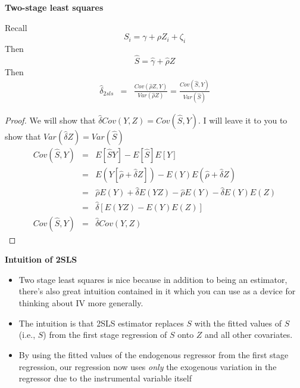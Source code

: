 \documentclass[notes=show]{beamer}
\begin{document}
\begin{frame}[plain]

	\begin{center}
	\textbf{Two-stage least squares}
	\end{center}
	
Recall $$S_i = \gamma + \rho{Z}_i + \zeta_i$$Then $$\widehat{S}=\widehat{\gamma} + \widehat{\rho}Z$$  
Then 
		\begin{eqnarray*}
		\widehat{\delta}_{2sls} &=& \frac{Cov(\widehat{\rho}Z,Y)}{Var(\widehat{\rho}Z)} =  \frac{Cov(\widehat{S},Y)}{Var(\widehat{S})}
		\end{eqnarray*}

\end{frame}


\begin{frame}[plain]

		\begin{proof}
		We will show that $\widehat{\delta}Cov(Y,Z) = Cov(\widehat{S},Y)$.  I will leave it to you to show that $Var(\widehat{\delta}Z) = Var(\widehat{S})$
		\begin{eqnarray*}
		Cov(\widehat{S},Y) &=& E[\widehat{S}Y] - E[\widehat{S}]E[Y] \\
		&=& E(Y[\widehat{\rho} + \widehat{\delta}Z]) - E(Y)E(\widehat{\rho} + \widehat{\delta}Z) \\
		&=& \widehat{\rho}E(Y) + \widehat{\delta}E(YZ) - \widehat{\rho}E(Y) - \widehat{\delta}E(Y)E(Z) \\
		&=&\widehat{\delta}[E(YZ) - E(Y)E(Z)] \\
		Cov(\widehat{S},Y) &=& \widehat{\delta}Cov(Y,Z)
		\end{eqnarray*}
		\qedhere
		\end{proof}

\end{frame}

\begin{frame}[plain]
	\begin{center}
	\textbf{Intuition of 2SLS}
	\end{center}
	
	\begin{itemize}
	\item Two stage least squares is nice because in addition to being an estimator, there's also great intuition contained in it which you can use as a device for thinking about IV more generally. 
	\item The intuition is that 2SLS estimator replaces $S$ with the fitted values of $S$ (i.e., $\widehat{S}$) from the first stage regression of $S$ onto $Z$ and all other covariates.  
	\item By using the fitted values of the endogenous regressor from the first stage regression, our regression now uses \emph{only} the exogenous variation in the regressor due to the instrumental variable itself
	\end{itemize}
\end{frame}
\end{document}
